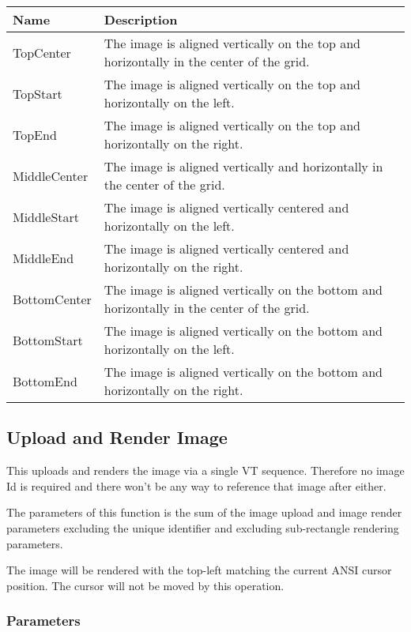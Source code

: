 \documentclass{article}
\begin{document}
\begin{tabular}{ |l|l| }
    \hline
    \textbf{Name}          & \textbf{Description} \\
    \hline
    TopCenter     & The image is aligned vertically on the top and horizontally in the center of the grid. \\
    TopStart      & The image is aligned vertically on the top and horizontally on the left. \\
    TopEnd        & The image is aligned vertically on the top and horizontally on the right. \\
    \hline
    MiddleCenter  & The image is aligned vertically and horizontally in the center of the grid. \\
    MiddleStart   & The image is aligned vertically centered and horizontally on the left. \\
    MiddleEnd     & The image is aligned vertically centered and horizontally on the right. \\
    \hline
    BottomCenter  & The image is aligned vertically on the bottom and horizontally in the center of the grid. \\
    BottomStart   & The image is aligned vertically on the bottom and horizontally on the left. \\
    BottomEnd     & The image is aligned vertically on the bottom and horizontally on the right. \\
    \hline
\end{tabular}

\subsection{Upload and Render Image}

This uploads and renders the image via a single VT sequence. Therefore no image Id
is required and there won't be any way to reference that image after either.

The parameters of this function is the sum of the image upload and image render parameters excluding the unique
identifier and excluding sub-rectangle rendering parameters.

The image will be rendered with the top-left matching the current ANSI cursor position.
The cursor will not be moved by this operation.

\subsubsection*{Parameters}
\end{document}
